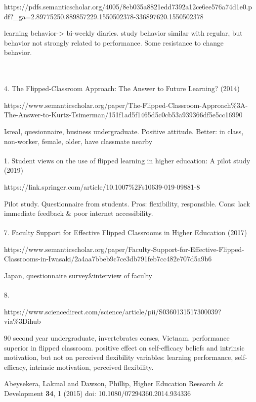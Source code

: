 \documentclass[onecolumn,aps,prd,groupedaddress,nofootinbib,notitlepage,12pt]{revtex4-1}
\begin{document}
https://pdfs.semanticscholar.org/4005/8eb035a8821edd7392a12ce6ee576a74d1e0.pdf?_ga=2.89775250.889857229.1550502378-336897620.1550502378

learning behavior-> bi-weekly diaries. 
study behavior similar with regular, but behavior not strongly related to performance.
Some resistance to change behavior.


\\\\
4. The Flipped-Classroom Approach: The Answer to Future Learning? (2014)

https://www.semanticscholar.org/paper/The-Flipped-Classroom-Approach\%3A-The-Answer-to-Kurtz-Tsimerman/151f1ad5f1465d5c0cb53a939366df5e5cc16990

Isreal, quesionnaire,  business undergraduate.
Positive attitude.
Better: in class, non-worker, female, older, have classmate nearby
\\\\
1. Student views on the use of flipped learning in higher education: A pilot study (2019)

https://link.springer.com/article/10.1007\%2Fs10639-019-09881-8

Pilot study. Questionnaire from students.
Pros: flexibility, responsible. 
Cons: lack immediate feedback \& poor internet accessibility.
\\\\
7. Faculty Support for Effective Flipped Classrooms in Higher Education (2017)

https://www.semanticscholar.org/paper/Faculty-Support-for-Effective-Flipped-Classrooms-in-Iwasaki/2a4aa7bbeb9c7ce3db791feb7cc482e707d5a9b6

Japan, questionnaire survey\&interview of  faculty
\\\\
8. 

https://www.sciencedirect.com/science/article/pii/S0360131517300039?via\%3Dihub

90 second year undergraduate, invertebrates corses, Vietnam.
performance superior in flipped classroom. 
positive effect on self-efficacy beliefs and intrinsic motivation, but not on perceived flexibility 
variables: learning performance, self-efficacy, intrinsic motivation, perceived flexibility.






\begin{thebibliography}{99}
Abeysekera, Lakmal and Dawson, Phillip,
Higher Education Research \& Development {\bf 34}, 1 (2015)
doi: 10.1080/07294360.2014.934336

%
\end{thebibliography}

\end{document}
